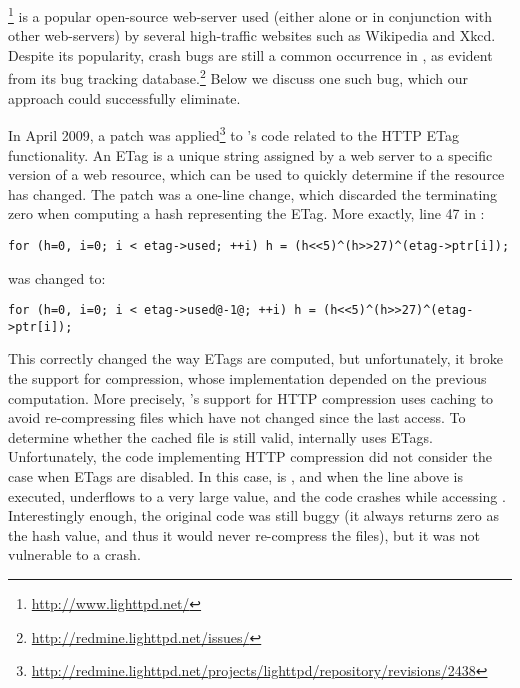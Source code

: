 \lighttpd\footnote{\url{http://www.lighttpd.net/}} is a popular open-source 
web-server used (either alone or in conjunction with other web-servers)
by several high-traffic websites such as Wikipedia and Xkcd.
Despite its popularity, crash bugs are still a common
occurrence in \lighttpd, as evident from its bug tracking
database.\footnote{\url{http://redmine.lighttpd.net/issues/}}  Below
we discuss one such bug, which our approach could successfully
eliminate.

In April 2009, a patch was
applied\footnote{\url{http://redmine.lighttpd.net/projects/lighttpd/repository/revisions/2438}}
to \lighttpd's code related to the HTTP ETag functionality.  An ETag
is a unique string assigned by a web server to a specific version of a
web resource, which can be used to quickly determine if the resource
has changed.  The patch was a one-line change, which discarded the
terminating zero when computing a hash representing the ETag.  More
exactly, line 47 in :

\begin{lstlisting}[numbers=none,breaklines=true,xleftmargin=0pt]
for (h=0, i=0; i < etag->used; ++i) h = (h<<5)^(h>>27)^(etag->ptr[i]);
\end{lstlisting}
\noindent was changed to:
\begin{lstlisting}[numbers=none,breaklines=true,xleftmargin=0pt]
for (h=0, i=0; i < etag->used@-1@; ++i) h = (h<<5)^(h>>27)^(etag->ptr[i]);
\end{lstlisting}

This correctly changed the way ETags are computed, but unfortunately,
it broke the support for compression, whose implementation depended on
the previous computation.  More precisely, \lighttpd's support for HTTP
compression uses caching to avoid re-compressing files which have not
changed since the last access.  To determine whether the cached
file is still valid, \lighttpd internally uses ETags.  Unfortunately,
the code implementing HTTP compression did not consider the case when
ETags are disabled.  In this case, 
is , and when the line above is
executed,  underflows to a very large value, and
the code crashes while accessing .
Interestingly enough, the original code was still buggy (it always
returns zero as the hash value, and thus it would never re-compress
the files), but it was not vulnerable to a crash.

